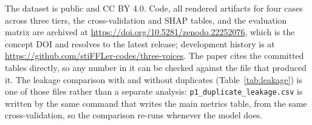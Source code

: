 The dataset is public and CC BY 4.0. Code, all rendered artifacts for four
cases across three tiers, the cross-validation and SHAP tables, and the
evaluation matrix are archived at
\url{https://doi.org/10.5281/zenodo.22252076}, which is the concept DOI and
resolves to the latest release; development history is at
\url{https://github.com/stiFFLer-codes/three-voices}. The paper cites the
committed tables directly, so any number in it can be checked against the
file that produced it. The leakage comparison with and without duplicates
(Table~\ref{tab:leakage}) is one of those files rather than a separate
analysis: \texttt{p1\_duplicate\_leakage.csv} is written by the same command
that writes the main metrics table, from the same cross-validation, so the
comparison re-runs whenever the model does.
